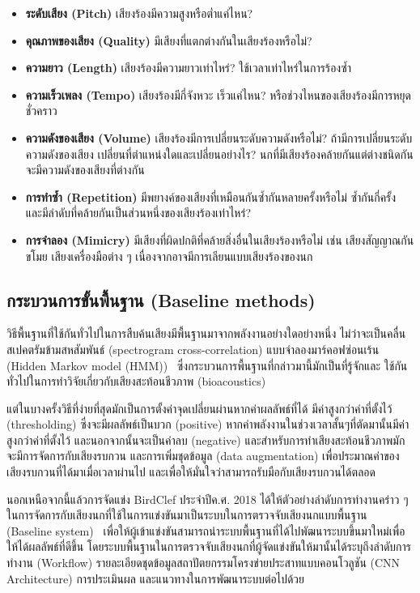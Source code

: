 \begin{itemize}
    \item \textbf{ระดับเสียง (Pitch)} เสียงร้องมีความสูงหรือต่ำแค่ไหน?
    \item \textbf{คุณภาพของเสียง (Quality)} มีเสียงที่แตกต่างกันในเสียงร้องหรือไม่? 
    \item \textbf{ความยาว (Length)} เสียงร้องมีความยาวเท่าไหร่? ใช้เวลาเท่าไหร่ในการร้องซ้ำ
    \item \textbf{ความเร็วเพลง (Tempo)} เสียงร้องมีกี่จังหวะ เร็วแค่ไหน? หรือช่วงไหนของเสียงร้องมีการหยุดชั่วคราว
    \item \textbf{ความดังของเสียง (Volume)} เสียงร้องมีการเปลี่ยนระดับความดังหรือไม่? ถ้ามีการเปลี่ยนระดับความดังของเสียง เปลี่ยนที่ตำแหน่งใดและเปลี่ยนอย่างไร? นกที่มีเสียงร้องคล้ายกันแต่ต่างชนิดกันจะมีความดังของเสียงที่ต่างกัน
    \item \textbf{การทำซ้ำ (Repetition)} มีพยางค์ของเสียงที่เหมือนกันซ้ำกันหลายครั้งหรือไม่ ซ้ำกันกี่ครั้ง และมีลำดับที่คล้ายกันเป็นส่วนหนึ่งของเสียงร้องเท่าไหร่?
    \item \textbf{การจำลอง (Mimicry)} มีเสียงที่ผิดปกติที่คล้ายสิ่งอื่นในเสียงร้องหรือไม่ เช่น เสียงสัญญาณกันขโมย เสียงเครื่องมือต่าง ๆ เนื่องจากอาจมีการเลียนแบบเสียงร้องของนก
\end{itemize}

\subsection{กระบวนการขั้นพื้นฐาน (Baseline methods)}
วิธีพื้นฐานที่ใช้กันทั่วไปในการสืบค้นเสียงมีพื้นฐานมาจากพลังงานอย่างใดอย่างหนึ่ง ไม่ว่าจะเป็นคลื่นสเปคตรัมข้ามสหสัมพันธ์ (spectrogram cross-correlation) แบบจำลองมาร์คอฟซ่อนเร้น (Hidden Markov model (HMM))~\cite{Yoon2009} ซึ่งกระบวนการพื้นฐานที่กล่าวมานี้มักเป็นที่รู้จักและ
ใช้กันทั่วไปในการทำวิจัยเกี่ยวกับเสียงสะท้อนชีวภาพ (bioacoustics) \par
แต่ในบางครั้งวิธีที่ง่ายที่สุดมักเป็นการตั้งค่าจุดเปลี่ยนผ่านหากค่าผลลัพธ์ที่ได้ มีค่าสูงกว่าค่าที่ตั้งไว้ (thresholding) ซึ่งจะมีผลลัพธ์เป็นบวก (positive) หากค่าพลังงานในช่วงเวลาสั้นๆที่ตัดมานั้นมีค่าสูงกว่าค่าที่ตั้งไว้
และนอกจากนั้นจะเป็นค่าลบ (negative) และสำหรับการทำเสียงสะท้อนชีวภาพมักจะมีการจัดการกับเสียงรบกวน และการเพิ่มชุดข้อมูล (data augmentation) เพื่อประมาณค่าของเสียงรบกวนที่ได้มาเมื่อเวลาผ่านไป 
และเพื่อให้มั่นใจว่าสามารถรับมือกับเสียงรบกวนได้ตลอด \par
นอกเหนือจากนี้แล้วการจัดแข่ง BirdClef ประจำปีค.ศ. 2018 ได้ให้ตัวอย่างลำดับการทำงานคร่าว ๆ ในการจัดการกับเสียงนกที่ใช้ในการแข่งขันมาเป็นระบบในการตรวจจับเสียงนกแบบพื้นฐาน (Baseline system)~\cite{Kahl2018}
เพื่อให้ผู้เข้าแข่งขันสามารถนำระบบพื้นฐานที่ได้ไปพัฒนาระบบขึ้นมาใหม่เพื่อให้ได้ผลลัพธ์ที่ดีขึ้น โดยระบบพื้นฐานในการตรวจจับเสียงนกที่ผู้จัดแข่งขันให้มานั้นได้ระบุถึงลำดับการทำงาน (Workflow) รายละเอียดชุดข้อมูลสถาปัตยกรรมโครงข่ายประสาทแบบคอนโวลูชัน (CNN Architecture)
การประเมินผล และแนวทางในการพัฒนาระบบต่อไปด้วย

